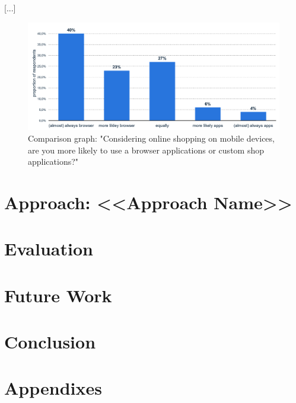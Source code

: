 [...]

\begin{figure}[!ht]
	\begin{center}
		\includegraphics[width=\textwidth]{./Images/mia_browser_vs_apps_diagram.png}
	\end{center}
	\caption{Comparison graph: "Considering online shopping on mobile devices, are you more likely to use a browser applications or custom shop applications?"~\cite[The survey question as well as the captions of the graph are translated to english in a contextual manner.]{nutzungeinesbrowsersshopeigenerapp_06.08.2019}}
	\label{fig:comparison-mia-browser-vs-apps-diagram}
\end{figure}

\chapter{Approach: <<Approach Name>>}
\label{ch:approach}

\chapter{Evaluation}
\label{ch:evaluation}

\chapter{Future Work}
\label{ch:future}

\chapter{Conclusion}
\label{ch:conclusion}

\chapter{Appendixes}
\label{ch:appendixes}

\listoffigures %

\printacronyms %

\listoftables %


